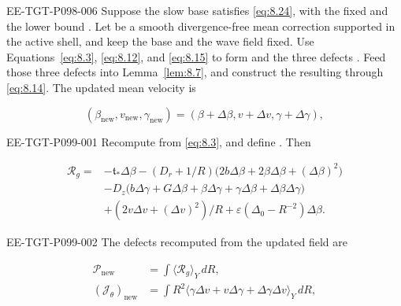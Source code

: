 \begin{lemma}\label{lem:8.8}
\begin{EESegment}{EE-TGT-P098-006}
Suppose the slow base satisfies \eqref{eq:8.24}, with the fixed
 and the lower bound
. Let
 be a smooth divergence-free mean correction supported in
the active shell, and keep the base and the wave field  fixed. Use
Equations~\eqref{eq:8.3}, \eqref{eq:8.12}, and \eqref{eq:8.15} to form
 and the three defects
. Feed those three defects into
Lemma~\ref{lem:8.7}, and construct the resulting  through
\eqref{eq:8.14}. The updated mean velocity is
\end{EESegment}
\[
(\beta_{\mathrm{new}},v_{\mathrm{new}},\gamma_{\mathrm{new}})
=(\beta+\Delta\beta,v+\Delta v,\gamma+\Delta\gamma),
\]
%
\begin{EESegment}{EE-TGT-P099-001}
Recompute  from \eqref{eq:8.3}, and define
. Then
\end{EESegment}
\begin{equation}
\begin{aligned}
\mathcal R_g={}&-\mathfrak t_*\Delta\beta
 -(D_r+1/R)\bigl(2b\Delta\beta+2\beta\Delta\beta+(\Delta\beta)^2\bigr)\\
&-D_z\bigl(b\Delta\gamma+G\Delta\beta+\beta\Delta\gamma
  +\gamma\Delta\beta+\Delta\beta\Delta\gamma\bigr)\\
&+(2v\Delta v+(\Delta v)^2)/R+\varepsilon(\Delta_0-R^{-2})\Delta\beta.
\end{aligned}
\tag{8.26}\label{eq:8.26}
\end{equation}
\begin{EESegment}{EE-TGT-P099-002}
The defects recomputed from the updated field are
\end{EESegment}
\begin{equation}
\begin{aligned}
\mathcal P_{\mathrm{new}}&=\int\langle\mathcal R_g\rangle_Y\,dR,\\
(\mathcal J_\theta)_{\mathrm{new}}&=
 \int R^2\langle\gamma\Delta v+v\Delta\gamma+\Delta\gamma\Delta v\rangle_Y\,dR,\\

\end{aligned}
\end{equation}
\end{lemma}
